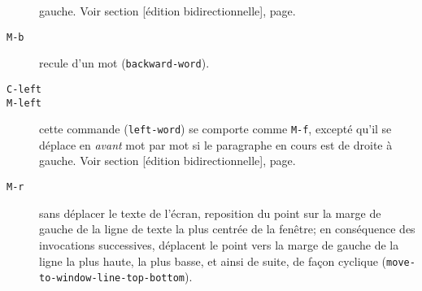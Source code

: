\begin{description}
  gauche. Voir section [édition bidirectionnelle],
  page.  
\item[\texttt{M-b}] recule d'un mot (\texttt{backward-word}). 
\item[\texttt{C-left}]
\item[\texttt{M-left}] cette commande (\texttt{left-word}) se
  comporte comme \texttt{M-f}, excepté qu'il se déplace en
  \emph{avant} mot par mot si le paragraphe en cours est de droite à
  gauche. Voir section [édition bidirectionnelle],
  page. 
\item[\texttt{M-r}] sans déplacer le texte de l'écran, reposition du
  point sur la marge de gauche de la ligne de texte la plus centrée de
  la fenêtre; en conséquence des invocations successives, déplacent le
  point vers la marge de gauche de la ligne la plus haute, la plus
  basse, et ainsi de suite, de façon cyclique
  (\texttt{move-to-window-line-top-bottom}). 


\end{description}
